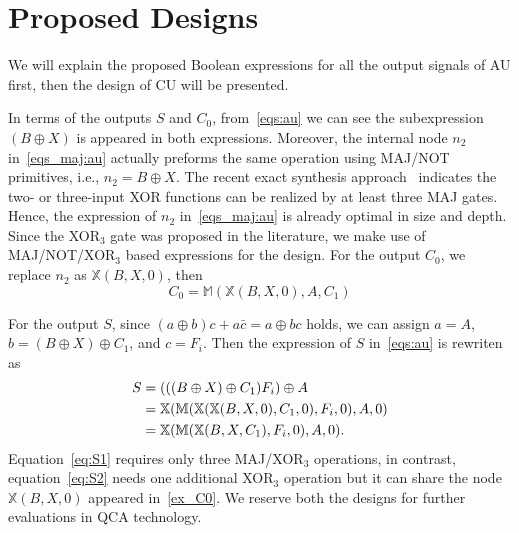 \documentclass[9pt,journal,compsoc]{IEEEtran}
\begin{document}
\vspace{-3ex}
\section{Proposed Designs}
We will explain the proposed Boolean expressions for all the output signals of AU first, then the design of CU will be presented.

In terms of the outputs $S$ and $C_0$, from~\eqref{eqs:au} we can see the
subexpression $(B \oplus X)$ is appeared in both expressions. Moreover, the internal node $n_2$ in~\eqref{eqs_maj:au} actually preforms the same operation using MAJ/NOT primitives, i.e., $n_2 = B \oplus X$.
The recent exact synthesis approach~\cite{soeken2017exact} indicates the two- or three-input XOR functions can be realized by at least three MAJ gates. Hence, the expression of $n_2$ in~\eqref{eqs_maj:au} is already optimal in size and depth.
Since the XOR$_3$ gate was proposed in the literature, we make use of MAJ/NOT/XOR$_3$ based expressions for the design.
For the output $C_0$, we replace $n_2$ as $\mathbb{X}(B, X, 0)$, then
\begin{equation}\label{ex_C0}
C_{0} = \mathbb{M}(\mathbb{X}(B, X, 0), A, C_{1})
\end{equation}

For the output $S$, since $(a \oplus b)c + a\bar c = a \oplus bc$ holds, we can assign $a = A$, $b = (B \oplus X) \oplus C_1$, and $c = F_i$. Then
the expression of $S$ in~\eqref{eqs:au} is rewriten as
\begin{subequations}\label{ex_S}
\begin{align}
S &= (((B \oplus X) \oplus C_1)F_i) \oplus A \notag \\
  &= \mathbb{X}(\mathbb{M}(\mathbb{X}(\mathbb{X}(B, X, 0), C_{1}, 0), F_{i}, 0), A, 0) \label{eq:S2} \\
  &= \mathbb{X}(\mathbb{M}(\mathbb{X}(B, X, C_1), F_i, 0), A, 0). \label{eq:S1} 
\end{align}
\end{subequations}
Equation~\eqref{eq:S1} requires only three MAJ/XOR$_3$ operations, in contrast, equation~\eqref{eq:S2} needs one additional XOR$_3$ operation but it can share the node $\mathbb{X}(B, X, 0)$ appeared in~\eqref{ex_C0}.
We reserve both the designs for further evaluations in QCA technology.


\end{document}
